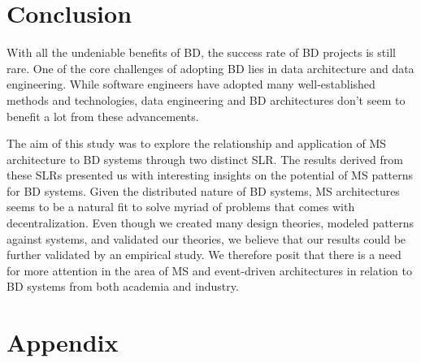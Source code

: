\documentclass{bmcart}
\begin{document}


 
\section{Conclusion}
With all the undeniable benefits of BD, the success rate of BD projects is still rare. One of the core challenges of adopting BD lies in data architecture and data engineering. While software engineers have adopted many well-established methods and technologies, data engineering and BD architectures don't seem to benefit a lot from these advancements. 

The aim of this study was to explore the relationship and application of MS architecture to BD systems through two distinct SLR. The results derived from these SLRs presented us with interesting insights on the potential of MS patterns for BD systems. Given the distributed nature of BD systems, MS architectures seems to be a natural fit to solve myriad of problems that comes with decentralization. Even though we created many design theories, modeled patterns against systems, and validated our theories, we believe that our results could be further validated by an empirical study. We therefore posit that there is a need for more attention in the area of MS and event-driven architectures in relation to BD systems from both academia and industry. 

\section*{Appendix}

\end{document}
